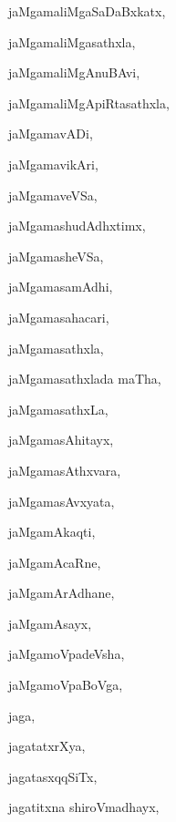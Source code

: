 \begin{multicols}{3}
{\noindent
{jaMgamaliMgaSaDaBxkatx}, \pageref{jaMgamaliMgaSaDaBxkatx}

\noindent
{jaMgamaliMgasathxla}, \pageref{jaMgamaliMgasathxla}

\noindent
{jaMgamaliMgAnuBAvi}, \pageref{jaMgamaliMgAnuBAvi}

\noindent
{jaMgamaliMgApiRtasathxla}, \pageref{jaMgamaliMgApiRtasathxla}

\noindent
{jaMgamavADi}, \pageref{jaMgamavADi}

\noindent
{jaMgamavikAri}, \pageref{jaMgamavikAri}

\noindent
{jaMgamaveVSa}, \pageref{jaMgamaveVSa}

\noindent
{jaMgamashudAdhxtimx}, \pageref{jaMgamashudAdhxtimx}

\noindent
{jaMgamasheVSa}, \pageref{jaMgamasheVSa}

\noindent
{jaMgamasamAdhi}, \pageref{jaMgamasamAdhi}

\noindent
{jaMgamasahacari}, \pageref{jaMgamasahacari}

\noindent
{jaMgamasathxla}, \pageref{jaMgamasathxla}

\noindent
{jaMgamasathxlada maTha}, \pageref{jaMgamasathxlada maTha}

\noindent
{jaMgamasathxLa}, \pageref{jaMgamasathxLa}

\noindent
{jaMgamasAhitayx}, \pageref{jaMgamasAhitayx}

\noindent
{jaMgamasAthxvara}, \pageref{jaMgamasAthxvara}

\noindent
{jaMgamasAvxyata}, \pageref{jaMgamasAvxyata}

\noindent
{jaMgamAkaqti}, \pageref{jaMgamAkaqti}

\noindent
{jaMgamAcaRne}, \pageref{jaMgamAcaRne}

\noindent
{jaMgamArAdhane}, \pageref{jaMgamArAdhane}

\noindent
{jaMgamAsayx}, \pageref{jaMgamAsayx}

\noindent
{jaMgamoVpadeVsha}, \pageref{jaMgamoVpadeVsha}

\noindent
{jaMgamoVpaBoVga}, \pageref{jaMgamoVpaBoVga}

\noindent
{jaga}, \pageref{jaga}

\noindent
{jagatatxrXya}, \pageref{jagatatxrXya}

\noindent
{jagatasxqqSiTx}, \pageref{jagatasxqqSiTx}

\noindent
{jagatitxna shiroVmadhayx}, \pageref{jagatitxna shiroVmadhayx}

}
\end{multicols}
